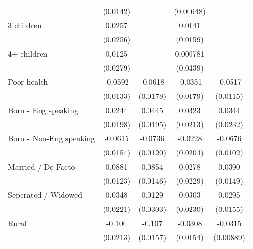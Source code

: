 {\begin{tabular}{l*{4}{c}}
                    &    (0.0142)         &                     &   (0.00648)         &                     \\
[1em]
3 children          &      0.0257         &                     &      0.0141         &                     \\
                    &    (0.0256)         &                     &    (0.0159)         &                     \\
[1em]
4+ children         &      0.0125         &                     &    0.000781         &                     \\
                    &    (0.0279)         &                     &    (0.0439)         &                     \\
[1em]
Poor health         &     -0.0592\sym{***}&     -0.0618\sym{***}&     -0.0351         &     -0.0517\sym{***}\\
                    &    (0.0133)         &    (0.0178)         &    (0.0179)         &    (0.0115)         \\
[1em]
Born - Eng speaking &      0.0244         &      0.0445\sym{*}  &      0.0323         &      0.0344         \\
                    &    (0.0198)         &    (0.0195)         &    (0.0213)         &    (0.0232)         \\
[1em]
Born - Non-Eng speaking&     -0.0615\sym{***}&     -0.0736\sym{***}&     -0.0228         &     -0.0676\sym{***}\\
                    &    (0.0154)         &    (0.0120)         &    (0.0204)         &    (0.0102)         \\
[1em]
Married / De Facto  &      0.0881\sym{***}&      0.0854\sym{***}&      0.0278         &      0.0390\sym{**} \\
                    &    (0.0123)         &    (0.0146)         &    (0.0229)         &    (0.0149)         \\
[1em]
Seperated / Widowed &      0.0348         &      0.0129         &      0.0303         &      0.0295         \\
                    &    (0.0221)         &    (0.0303)         &    (0.0230)         &    (0.0155)         \\
[1em]
Rural               &      -0.100\sym{***}&      -0.107\sym{***}&     -0.0308\sym{*}  &     -0.0315\sym{***}\\
                    &    (0.0213)         &    (0.0157)         &    (0.0154)         &   (0.00889)         \\

\end{tabular}}
